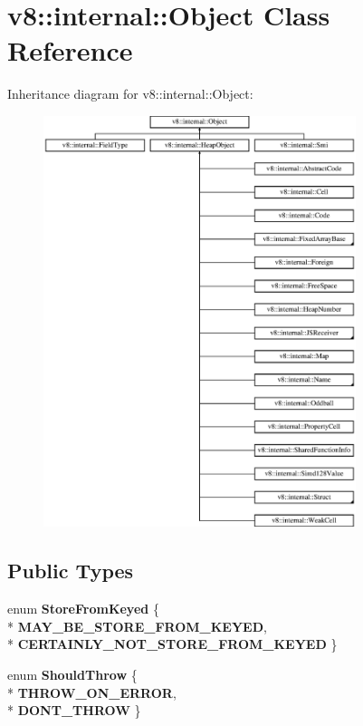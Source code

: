 \hypertarget{classv8_1_1internal_1_1_object}{}\section{v8\+:\+:internal\+:\+:Object Class Reference}
\label{classv8_1_1internal_1_1_object}
Inheritance diagram for v8\+:\+:internal\+:\+:Object\+:\begin{figure}[H]
\begin{center}
\leavevmode
\includegraphics[height=12.000000cm]{classv8_1_1internal_1_1_object}
\end{center}
\end{figure}
\subsection*{Public Types}
\begin{DoxyCompactItemize}
\item 
enum {\bfseries Store\+From\+Keyed} \{ \\*
{\bfseries M\+A\+Y\+\_\+\+B\+E\+\_\+\+S\+T\+O\+R\+E\+\_\+\+F\+R\+O\+M\+\_\+\+K\+E\+Y\+ED}, 
\\*
{\bfseries C\+E\+R\+T\+A\+I\+N\+L\+Y\+\_\+\+N\+O\+T\+\_\+\+S\+T\+O\+R\+E\+\_\+\+F\+R\+O\+M\+\_\+\+K\+E\+Y\+ED}
 \}\hypertarget{classv8_1_1internal_1_1_object_a49bfc483fe7dd232e030ef1b7bba66b4}{}\label{classv8_1_1internal_1_1_object_a49bfc483fe7dd232e030ef1b7bba66b4}

\item 
enum {\bfseries Should\+Throw} \{ \\*
{\bfseries T\+H\+R\+O\+W\+\_\+\+O\+N\+\_\+\+E\+R\+R\+OR}, 
\\*
{\bfseries D\+O\+N\+T\+\_\+\+T\+H\+R\+OW}
 \}\hypertarget{classv8_1_1internal_1_1_object_a280fd4f27cebd3f6f61ceb87080bebfb}{}\label{classv8_1_1internal_1_1_object_a280fd4f27cebd3f6f61ceb87080bebfb}

\end{DoxyCompactItemize}
